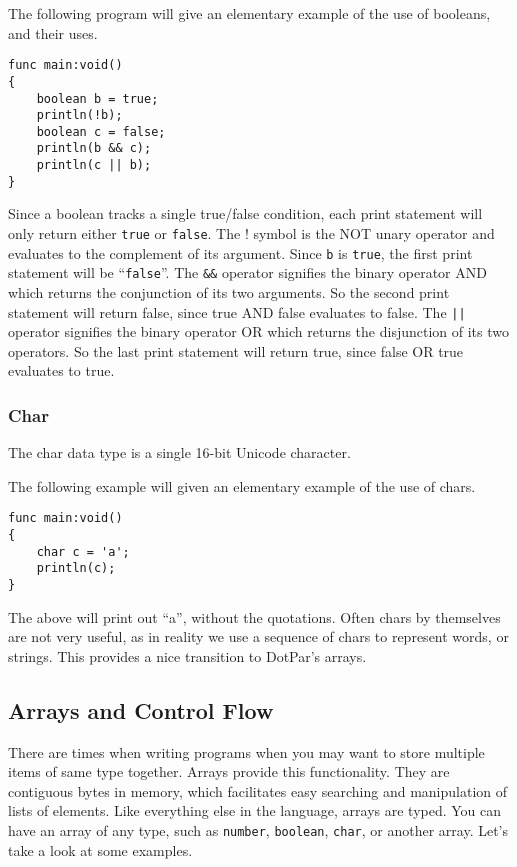 \documentclass{article}
\begin{document}
The following program will give an elementary example of the use of booleans, and their uses.  

\begin{verbatim}
func main:void()
{
    boolean b = true;
    println(!b);
    boolean c = false;
    println(b && c);
    println(c || b);  
}
\end{verbatim}

Since a boolean tracks a single true/false condition, each print statement will only return either \verb=true= or \verb=false=.  The ! symbol is the NOT unary operator and evaluates to the complement of its argument.  Since \verb=b= is \verb=true=, the first print statement will be ``\verb=false=''.  The \verb=&&= operator signifies the binary operator AND which returns the conjunction of its two arguments.  So the second print statement will return false, since true AND false evaluates to false. The \verb=||= operator signifies the binary operator OR which returns the disjunction of its two operators.  So the last print statement will return true, since false OR true evaluates to true. 

\subsubsection{Char}
The char data type is a single 16-bit Unicode character. 

The following example will given an elementary example of the use of chars.

\begin{verbatim}
func main:void()
{
    char c = 'a';
    println(c);
}
\end{verbatim}

The above will print out ``a'', without the quotations. Often chars by themselves are not very useful, as in reality we use a sequence of chars to represent words, or strings.  This provides a nice transition to DotPar's arrays.

\subsection{Arrays and Control Flow}
There are times when writing programs when you may want to store multiple items of same type together. Arrays provide this functionality. They are contiguous bytes in memory, which facilitates easy searching and manipulation of lists of elements. Like everything else in the language, arrays are typed. You can have an array of any type, such as \verb=number=, \verb=boolean=, \verb=char=, or another array. Let's take a look at some examples.
\end{document}
